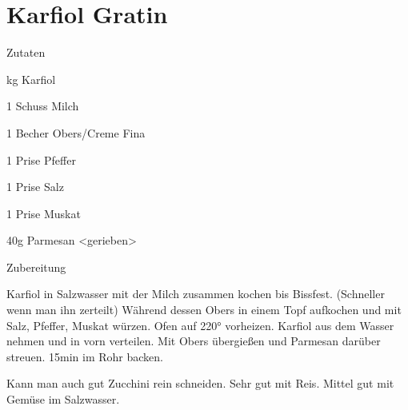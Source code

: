 \chapter*{Karfiol Gratin}
\begin{multicols}{2}
 {\Large Zutaten}
 \begin{Zutaten}
		\item {}kg Karfiol
		\item 1 Schuss Milch
		\item 1 Becher Obers/Creme Fina
		\item 1 Prise Pfeffer
		\item 1 Prise Salz
		\item 1 Prise Muskat
		\item 40g Parmesan <gerieben>
			
				
\end{Zutaten}
	
\columnbreak
{}
\end{multicols}

{\Large Zubereitung} \newline
\begin{addmargin}[1cm]{0cm}
	Karfiol in Salzwasser mit der Milch zusammen kochen bis Bissfest. (Schneller wenn man ihn zerteilt) \newline
	Während dessen Obers in einem Topf aufkochen und mit Salz, Pfeffer, Muskat würzen. \newline
	Ofen auf 220° vorheizen. \newline
	Karfiol aus dem Wasser nehmen und in vorn verteilen. Mit Obers übergießen und Parmesan darüber
	streuen. \newline
	15min im Rohr backen.\newline\newline
	
	Kann man auch gut Zucchini rein schneiden.\newline
	Sehr gut mit Reis.\newline
	Mittel gut mit Gemüse im Salzwasser.
	
\end{addmargin}
